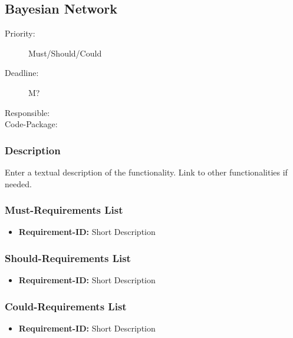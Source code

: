 \subsection{Bayesian Network}
\label{Functionality:ID}

\begin{description}
\item[Priority:] Must/Should/Could
\item[Deadline:] M?
\item[Responsible:]
\item[Code-Package:]
\end{description}

\subsubsection*{Description}

Enter a textual description of the functionality. Link to other functionalities if needed. 


\subsubsection*{Must-Requirements List}

\begin{itemize}
\item \textbf{Requirement-ID:} Short Description
\end{itemize}

\subsubsection*{Should-Requirements List}

\begin{itemize}
\item \textbf{Requirement-ID:} Short Description
\end{itemize}

\subsubsection*{Could-Requirements List}

\begin{itemize}
\item \textbf{Requirement-ID:} Short Description
\end{itemize}

